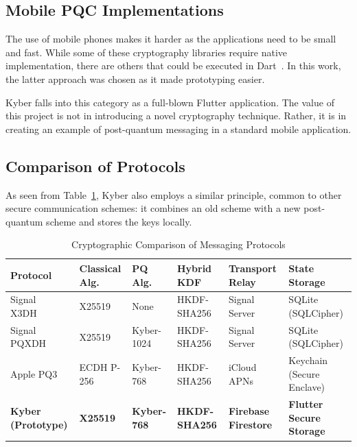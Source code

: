 \subsection{Mobile PQC Implementations}
The use of mobile phones makes it harder as the applications need to be small and fast. While some of these cryptography libraries require native implementation, there are others that could be executed in Dart~\cite{fips203}. In this work, the latter approach was chosen as it made prototyping easier.

Kyber falls into this category as a full-blown Flutter application. The value of this project is not in introducing a novel cryptography technique. Rather, it is in creating an example of post-quantum messaging in a standard mobile application.

\subsection{Comparison of Protocols}
As seen from Table~\ref{tab:comparison}, Kyber also employs a similar principle, common to other secure communication schemes: it combines an old scheme with a new post-quantum scheme and stores the keys locally.

\begin{table}[t]
\centering
\caption{Cryptographic Comparison of Messaging Protocols}
\label{tab:comparison}
\begin{tabular}{llllll}
\toprule
\textbf{Protocol} & \textbf{Classical Alg.} & \textbf{PQ Alg.} & \textbf{Hybrid KDF} & \textbf{Transport Relay} & \textbf{State Storage} \\
\midrule
Signal X3DH~\cite{doubleratchet} & X25519~\cite{rfc7748} & None & HKDF-SHA256 & Signal Server & SQLite (SQLCipher) \\
Signal PQXDH~\cite{pqxdh} & X25519~\cite{rfc7748} & Kyber-1024~\cite{pqxdh} & HKDF-SHA256 & Signal Server & SQLite (SQLCipher) \\
Apple PQ3~\cite{pq3} & ECDH P-256 & Kyber-768~\cite{pq3} & HKDF-SHA256 & iCloud APNs & Keychain (Secure Enclave) \\
\textbf{Kyber (Prototype)} & \textbf{X25519~\cite{rfc7748}} & \textbf{Kyber-768~\cite{fips203}} & \textbf{HKDF-SHA256} & \textbf{Firebase Firestore} & \textbf{Flutter Secure Storage} \\
\bottomrule
\end{tabular}
\end{table}

